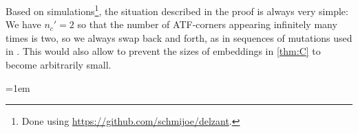 \documentclass[12pt,a4paper,abstract=true,final]{scrartcl}
\begin{document}
\begin{remark}
  \label{rem:possible_uniform_lower_bound}
    Based on simulations\footnote{Done using \url{https://github.com/schmijoe/delzant}.}, the situation described in the proof is always very simple: 
    We have $n_c'=2$ so that the number of ATF-corners appearing infinitely many times is two, so we always swap back and forth, as in sequences of mutations used in \cite{EvaUrz21}.
    This would also allow to prevent the sizes of embeddings in \cref{thm:C} to become arbitrarily small.
\end{remark}

\emergencystretch=1em
\printbibliography
\end{document}
